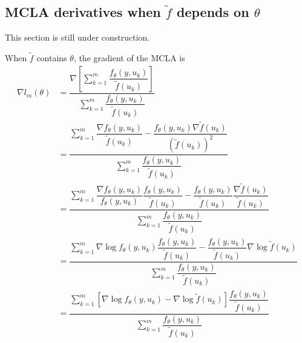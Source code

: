 \documentclass{article}
\begin{document}
\subsection{MCLA derivatives when $\tilde{f}$ depends on $\theta$} \label{sec:calcs}
This section is still under construction.

When $\tilde{f}$ contains $\theta$, the gradient of the MCLA is
\begin{align}
\nabla l_m(\theta) &= \dfrac{ \nabla \left[ \sum_{k=1}^m  \dfrac{ f_\theta(y,u_k)   }{\tilde{f}(u_k)}  \right] }{\sum_{k=1}^m  \dfrac{ f_\theta(y,u_k)   }{\tilde{f}(u_k)}} \\
&= \dfrac{   \sum_{k=1}^m  \dfrac{\nabla f_\theta(y,u_k)   }{\tilde{f}(u_k)} - \dfrac{ f_\theta(y,u_k)  \nabla \tilde{f}(u_k) }{\left(\tilde{f}(u_k) \right)^2 } }{\sum_{k=1}^m  \dfrac{ f_\theta(y,u_k)   }{\tilde{f}(u_k)}} \\
&= \dfrac{   \sum_{k=1}^m  \dfrac{\nabla f_\theta(y,u_k)}{f_\theta(y,u_k)} \dfrac{f_\theta(y,u_k)}{\tilde{f}(u_k)} -
 \dfrac{ f_\theta(y,u_k)}{\tilde{f}(u_k)} \dfrac{ \nabla \tilde{f}(u_k) }{\tilde{f}(u_k) } }{\sum_{k=1}^m  \dfrac{ f_\theta(y,u_k)   }{\tilde{f}(u_k)}} \\
&= \dfrac{   \sum_{k=1}^m  \nabla \log f_\theta(y,u_k) \dfrac{f_\theta(y,u_k)}{\tilde{f}(u_k)} -
 \dfrac{ f_\theta(y,u_k)}{\tilde{f}(u_k)}  \nabla \log \tilde{f}(u_k)  }{\sum_{k=1}^m  \dfrac{ f_\theta(y,u_k)   }{\tilde{f}(u_k)}} \\
&= \dfrac{   \sum_{k=1}^m \left[ \nabla \log f_\theta(y,u_k)  -
   \nabla \log \tilde{f}(u_k)   \right]  \dfrac{ f_\theta(y,u_k)}{\tilde{f}(u_k)}  }{\sum_{k=1}^m  \dfrac{ f_\theta(y,u_k)   }{\tilde{f}(u_k)}} 
\end{align}
\end{document}
